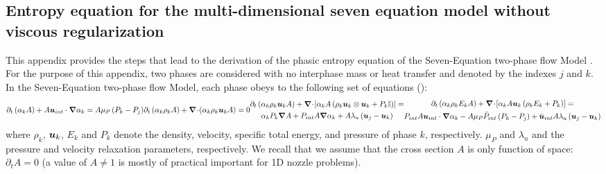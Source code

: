 \begin{appendices}



\section{Entropy equation for the multi-dimensional seven equation model without viscous regularization}\label{app:sev-equ-model-entropy}
%
This appendix provides the steps that lead to the derivation of the phasic entropy equation of the Seven-Equation two-phase flow Model \cite{SEM}. For the purpose of this appendix, two phases are considered with no interphase mass or heat transfer and denoted by the indexes $j$ and $k$. In the Seven-Equation two-phase flow Model, each phase obeys to the following set of equations ():
\begin{subequations}
\label{eq:sev_equ-app}
%
\begin{align}
\partial_t \left( \alpha_k  A\right) + A \mbold u_{int} \cdot \grad \alpha_k = A \mu_P \left( P_k - P_j \right) 
\end{align}
%
\begin{align}
\partial_t \left( \alpha_k \rho_k A \right) + \div \left( \alpha_k \rho_k \mbold u_k A \right) = 0 
\end{align}
%
\begin{multline}
\partial_t \left( \alpha_k \rho_k \mbold u_k A \right) + \div \left[ \alpha_k A \left( \rho_k \mbold u_k \otimes \mbold u_k + P_k \mathbb{I} \right) \right] =\\
\alpha_k P_k \grad A + P_{int} A \grad \alpha_k + A \lambda_u \left( \mbold u_j - \mbold u_k \right) 
\end{multline}
%
\begin{multline}
\partial_t \left( \alpha_k \rho_k E_k A \right) + \div \left[ \alpha_k A \mbold u_k \left( \rho_k E_k + P_k \right) \right] = \\
P_{int} A \mbold u_{int} \cdot \grad \alpha_k - A\mu_P \bar{P}_{int} \left( P_k-P_j \right) + \bar{\mbold u}_{int} A \lambda_u \left( \mbold u_j - \mbold u_k \right)
\end{multline}
\end{subequations}
where $\rho_k$, $\boldsymbol u_k$, $E_k$ and $P_k$ denote the density, velocity, specific total energy, and pressure of  phase $k$, respectively. $\mu_P$ and $\lambda_u$ and the pressure and velocity relaxation parameters, respectively. We recall that we assume that the cross section $A$ is only function of space: $\partial_t A = 0$ (a value of $A \neq 1$ is mostly of practical important for 1D nozzle problems). 

\end{appendices}
